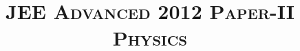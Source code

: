 \documentclass{article}
\title{\textsc{JEE Advanced 2012 Paper-II\\Physics}}
\date{}
\begin{document}
\maketitle
\begin{enumerate}
    
    
    
    
    
    
    
    
    
    
    
    
    
    
    
    
    
\end{enumerate}
\end{document}
